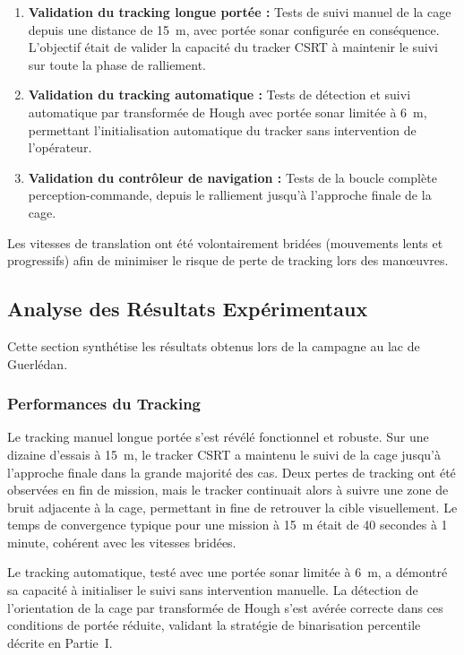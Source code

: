 \begin{enumerate}
    \item \textbf{Validation du tracking longue portée :} Tests de suivi manuel de la cage depuis une distance de 15~m, avec portée sonar configurée en conséquence. L'objectif était de valider la capacité du tracker CSRT à maintenir le suivi sur toute la phase de ralliement.
    
    \item \textbf{Validation du tracking automatique :} Tests de détection et suivi automatique par transformée de Hough avec portée sonar limitée à 6~m, permettant l'initialisation automatique du tracker sans intervention de l'opérateur.
    
    \item \textbf{Validation du contrôleur de navigation :} Tests de la boucle complète perception-commande, depuis le ralliement jusqu'à l'approche finale de la cage.
\end{enumerate}

Les vitesses de translation ont été volontairement bridées (mouvements lents et progressifs) afin de minimiser le risque de perte de tracking lors des manœuvres.

\subsection{Analyse des Résultats Expérimentaux}

Cette section synthétise les résultats obtenus lors de la campagne au lac de Guerlédan.

\subsubsection*{Performances du Tracking}

Le tracking manuel longue portée s'est révélé fonctionnel et robuste. Sur une dizaine d'essais à 15~m, le tracker CSRT a maintenu le suivi de la cage jusqu'à l'approche finale dans la grande majorité des cas. Deux pertes de tracking ont été observées en fin de mission, mais le tracker continuait alors à suivre une zone de bruit adjacente à la cage, permettant in fine de retrouver la cible visuellement. Le temps de convergence typique pour une mission à 15~m était de 40 secondes à 1 minute, cohérent avec les vitesses bridées.

Le tracking automatique, testé avec une portée sonar limitée à 6~m, a démontré sa capacité à initialiser le suivi sans intervention manuelle. La détection de l'orientation de la cage par transformée de Hough s'est avérée correcte dans ces conditions de portée réduite, validant la stratégie de binarisation percentile décrite en Partie~I.

